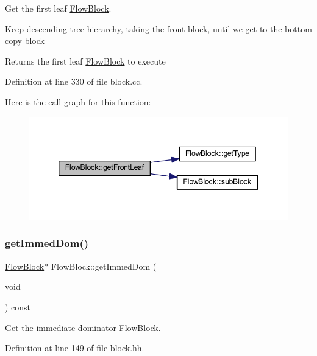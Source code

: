 Get the first leaf \mbox{\hyperlink{class_flow_block}{Flow\+Block}}. 

Keep descending tree hierarchy, taking the front block, until we get to the bottom copy block \begin{DoxyReturn}{Returns}
the first leaf \mbox{\hyperlink{class_flow_block}{Flow\+Block}} to execute 
\end{DoxyReturn}


Definition at line 330 of file block.\+cc.

Here is the call graph for this function\+:
\nopagebreak
\begin{figure}[H]
\begin{center}
\leavevmode
\includegraphics[width=346pt]{class_flow_block_a79329e1df72d004f0b7b8ff475e0143d_cgraph}
\end{center}
\end{figure}
\mbox{\label{class_flow_block_a4b223b939cafc0405323dd0d6dc749d6}} 
\subsubsection{\texorpdfstring{getImmedDom()}{getImmedDom()}}
{\footnotesize\ttfamily \mbox{\hyperlink{class_flow_block}{Flow\+Block}}$\ast$ Flow\+Block\+::get\+Immed\+Dom (\begin{DoxyParamCaption}\item[{void}]{ }\end{DoxyParamCaption}) const\hspace{0.3cm}{\ttfamily [inline]}}



Get the immediate dominator \mbox{\hyperlink{class_flow_block}{Flow\+Block}}. 



Definition at line 149 of file block.\+hh.

